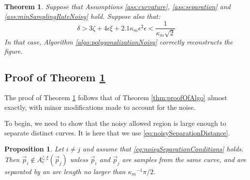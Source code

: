 \documentclass{article}
\newcommand{\nin}{\not\in}
\newtheorem{proposition}[cntr]{Proposition}
\newtheorem{theorem}[cntr]{Theorem}
\numberwithin{cntr}{section}
\numberwithin{equation}{section}
\newcommand{\vp}[0]{{\vec{p}}}
\newcommand{\curvemax}{{\kappa_{m}}}
\newcommand{\curvemaxi}{{\curvemax^{-1}}}
\newcommand{\curvesep}{{\delta}}
\newcommand{\pointNoise}{{\zeta}}
\newcommand{\tanNoise}{{\xi}}
\newcommand{\nallowed}[2]{ { A^{\pointNoise, \tanNoise}_{#1}(#2) } }
\begin{document}
\begin{theorem}
  \label{thm:noisyReconstruction}
  Suppose that Assumptions \ref{ass:curvature}, \ref{ass:separation} and \ref{ass:minSamplingRateNoisy} hold. Suppose also that:
  \begin{subequations}
    \label{eq:noisySeparationConditions}
    \begin{equation}
      \label{eq:noisySeparationDistance}
      \curvesep > 3 \pointNoise + 4 \epsilon \tanNoise + 2.1 \curvemax \epsilon^{2}
    \end{equation}
    \begin{equation}
      \label{eq:noisyConstraintOnkmaxEpsilon}
      \epsilon < \frac{1}{ \curvemax \sqrt{2}}
    \end{equation}
  \end{subequations}
  In that case, Algorithm \ref{algo:polygonalizationNoisy} correctly reconstructs the figure.
\end{theorem}

\subsection{Proof of Theorem \ref{thm:noisyReconstruction}}

The proof of Theorem \ref{thm:noisyReconstruction} follows that of Theorem \ref{thm:proofOfAlgo} almost exactly, with minor modifications made to account for the noise.

To begin, we need to show that the noisy allowed region is large enough to separate distinct curves. It is here that we use \eqref{eq:noisySeparationDistance}.

\begin{proposition}
  Let $i \neq j$ and assume that \eqref{eq:noisySeparationConditions} holds. Then $\vp_{i} \nin \nallowed{\epsilon}{\vp_{j}}$ unless $\vp_{i}$ and $\vp_{j}$ are samples from the same curve, and are separated by an arc length no larger than $\curvemaxi \pi/2$.
\end{proposition}
\end{document}
